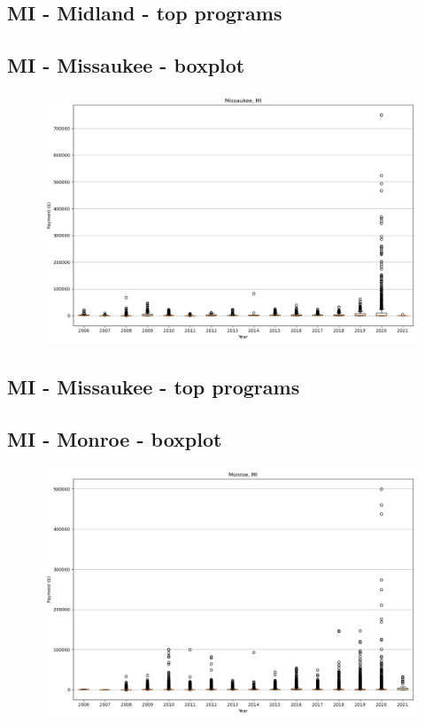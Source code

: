 \subsection*{MI - Midland - top programs}

\newpage
\subsection*{MI - Missaukee - boxplot}
\begin{figure}[h]
\centering
\includegraphics[width=7in]{../output/boxplots/counties/Missaukee-MI_boxplot.png}
\end{figure}


\subsection*{MI - Missaukee - top programs}

\newpage
\subsection*{MI - Monroe - boxplot}
\begin{figure}[h]
\centering
\includegraphics[width=7in]{../output/boxplots/counties/Monroe-MI_boxplot.png}
\end{figure}


